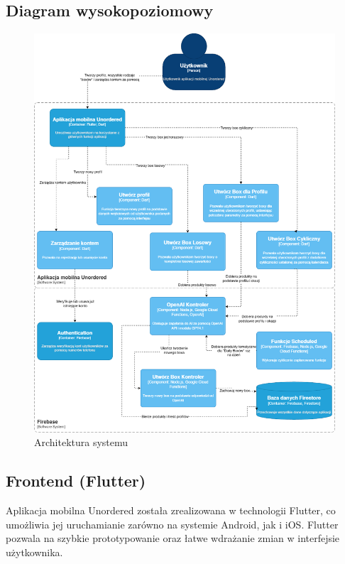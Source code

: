 \documentclass[a4paper, 12pt]{article}
\begin{document}
\subsection{Diagram wysokopoziomowy}
\begin{figure}[ht]
    \centering
    \includegraphics[height=0.745\textheight,keepaspectratio]{images/unordered.c4.png}
    \caption{Architektura systemu}
    \label{fig:architecture}
\end{figure}

\newpage

\subsection{Frontend (Flutter)}
Aplikacja mobilna Unordered została zrealizowana w technologii Flutter, co umożliwia jej uruchamianie zarówno na systemie Android, jak i iOS. Flutter pozwala na szybkie prototypowanie oraz łatwe wdrażanie zmian w interfejsie użytkownika.
\end{document}
